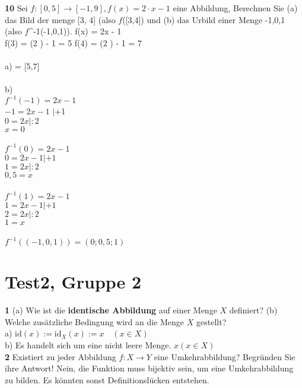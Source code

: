\documentclass[11pt]{article}
\begin{document}
\textbf{10} Sei $f : [0,5] \rightarrow [-1,9], f(x) = 2 \cdot x - 1$ eine Abbildung, Berechnen Sie (a) das Bild der menge [3, 4] (also $f$([3,4]) und (b) das Urbild einer Menge {-1,0,1} (also $f$^{-1}({-1,0,1})).\newline\newline
    f(x) = 2x - 1 \\
    f(3) = (2 ) - 1 = 5 \quad \quad f(4) = (2 ) - 1 = 7 \\\\
    a)  = [5,7]\\\\
    b)\\$ f^{-1}(-1) = 2x-1$ \\ $ -1 = 2x - 1$ $|$+1\\$ 0 = 2x |:2$\\$x = 0$\\\\
    $ f^{-1}(0) = 2x-1$ \\ $ 0 = 2x - 1 |+1$\\ $ 1 = 2x |:2$\\$ 0,5 = x$\\\\
    $ f^{-1}(1) = 2x-1$ \\ $ 1 = 2x - 1 |+1$\\ $ 2 = 2x |:2$\\$1 = x$\\\\
    $f^{-1}((-1,0,1)) = (0;0,5;1)$

    \section{Test2, Gruppe 2}

    \textbf{1} (a) Wie ist die \textbf{identische Abbildung} auf einer Menge $X$ definiert? (b) Welche zusätzliche Bedingung wird an die Menge $X$ gestellt?\\
    a) $\text{id}(x) := \text{id}_X(x) := x \quad (x \in X)$\\
    b) Es handelt sich um eine nicht leere Menge. $x(x \in X)$\\

    \textbf{2} Existiert zu jeder Abbildung $f : X \rightarrow Y $ eine Umkehrabbildung? Begründen Sie ihre Antwort!\newline
    Nein, die Funktion muss bijektiv sein, um eine Umkehrabbildung zu bilden. Es könnten sonst Definitionslücken entstehen.\newline
\end{document}
